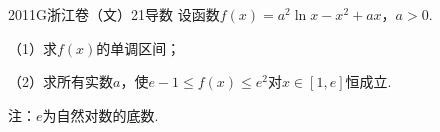 
\begin{problem}{2011}{G}{浙江卷（文）}{21}{导数}
设函数$f(x)=a^2\ln x -x^2 +ax$，$a>0$.

（1）求$f(x)$的单调区间；

（2）求所有实数$a$，使$e-1 \leq f(x) \leq e^2$对$x\in[1,e]$恒成立.

注：$e$为自然对数的底数.
\end{problem}